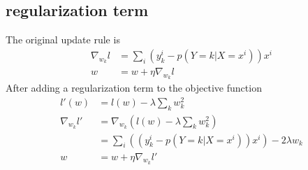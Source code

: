 \documentclass[12pt]{article}
\begin{document}
\begin{multicols}{2}
  \subsection{regularization term}
  The original update rule is
  \begin{align*}
    \nabla_{w_k} l  &= \sum_i (y_k^i - p(Y=k|X=x^i))x^i \\
    w &= w + \eta \nabla_{w_k} l
  \end{align*}
  After adding a regularization term to the objective function
  \begin{align*}
    l'(w)
    &= l(w) - \lambda \sum_k w_k^2 \\
    \nabla_{w_k} l'
    &= \nabla_{w_k} (l(w) - \lambda \sum_k w_k^2) \\
    &= \sum_i ((y_k^i - p(Y=k|X=x^i))x^i) - 2 \lambda w_k \\
    w
    &= w + \eta \nabla_{w_k} l'
  \end{align*}

\end{multicols}{}
\end{document}
